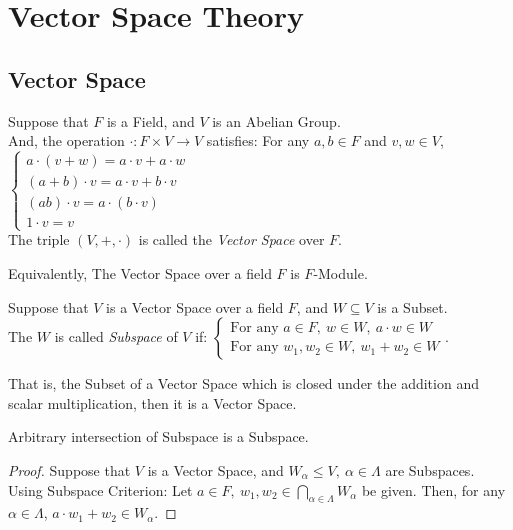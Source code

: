 \chapter{Vector Space Theory}
\section{Vector Space}
\begin{definition}
    Suppose that $F$ is a Field, and $V$ is an Abelian Group. \\
    And, the operation $\cdot: F \times V \to V$ satisfies: For any $a, b \in F$ and $v, w \in V$,
    $\begin{cases}
        a \cdot (v + w) = a\cdot v + a\cdot w \\
        (a + b) \cdot v = a\cdot v + b\cdot v \\
        (ab) \cdot v = a \cdot (b \cdot v) \\
        1 \cdot v = v
    \end{cases}$ \\
    The triple $(V, +, \cdot)$ is called the \textit{Vector Space} over $F$.
\end{definition}
Equivalently, The Vector Space over a field $F$ is $F$-Module.
\begin{definition}
    Suppose that $V$ is a Vector Space over a field $F$, and $W \subseteq V$ is a Subset. \\
    The $W$ is called \textit{Subspace} of $V$ if:
    $\begin{cases}
        \text{For any $a \in F,\ w \in W,\ a \cdot w \in W$} \\
        \text{For any $w_1, w_2 \in W,\ w_1 + w_2 \in W$}
    \end{cases}$. \\
\end{definition}
That is, the Subset of a Vector Space which is closed under the addition and scalar multiplication, then it is a Vector Space.
\begin{lemma}
    Arbitrary intersection of Subspace is a Subspace.
\end{lemma}
\begin{proof}
    Suppose that $V$ is a Vector Space, and $W_\alpha \leq V,\ \alpha \in \Lambda$ are Subspaces. \\
    Using Subspace Criterion: Let $a \in F,\ w_1, w_2 \in \bigcap_{\alpha \in \Lambda} W_\alpha$ be given.
    Then, for any $\alpha \in \Lambda$, $a \cdot w_1 + w_2 \in W_\alpha$.
\end{proof}
